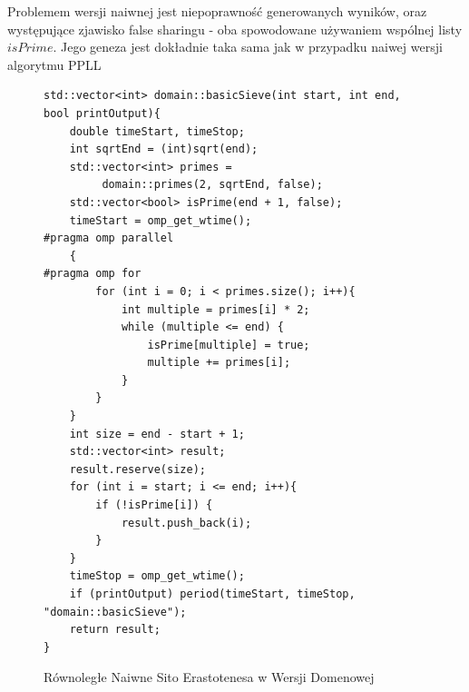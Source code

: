 \documentclass{article}
\begin{document}
                    Problemem wersji naiwnej jest niepoprawność generowanych wyników, oraz występujące zjawisko false sharingu - oba spowodowane używaniem wspólnej listy $isPrime$. Jego geneza jest dokładnie taka sama jak w przypadku naiwej wersji algorytmu \gls{PPLL}
                    \begin{figure}
                        \begin{verbatim}
std::vector<int> domain::basicSieve(int start, int end, bool printOutput){
    double timeStart, timeStop;
    int sqrtEnd = (int)sqrt(end);
    std::vector<int> primes =
         domain::primes(2, sqrtEnd, false);
    std::vector<bool> isPrime(end + 1, false);
    timeStart = omp_get_wtime();
#pragma omp parallel 
    {
#pragma omp for
        for (int i = 0; i < primes.size(); i++){
            int multiple = primes[i] * 2;
            while (multiple <= end) {
                isPrime[multiple] = true;
                multiple += primes[i];
            }
        }
    }
    int size = end - start + 1;
    std::vector<int> result;
    result.reserve(size);
    for (int i = start; i <= end; i++){
        if (!isPrime[i]) {
            result.push_back(i);
        }
    }
    timeStop = omp_get_wtime();
    if (printOutput) period(timeStart, timeStop, "domain::basicSieve");
    return result;
}
                        \end{verbatim}
                        \caption{Równoległe Naiwne Sito Erastotenesa w Wersji Domenowej}
                    \end{figure}
                    
\end{document}

